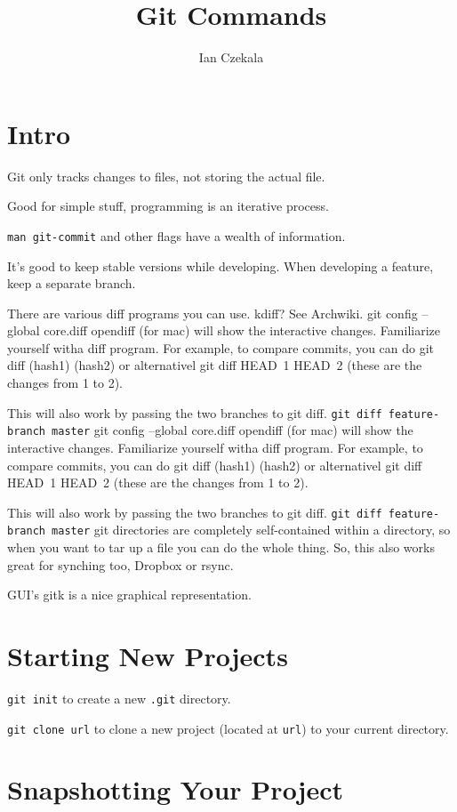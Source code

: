 \documentclass[iop,floatfix]{emulateapj}
\begin{document}
\title{Git Commands}
\author{Ian Czekala}

\section{Intro}
Git only tracks changes to files, not storing the actual file.

Good for simple stuff, programming is an iterative process.

\verb|man git-commit| and other flags have a wealth of information.

It's good to keep stable versions while developing. When developing a feature, keep a separate branch.

There are various diff programs you can use. kdiff? See Archwiki.
git config --global core.diff opendiff (for mac) will show the interactive changes. Familiarize yourself witha diff program. For example, to compare commits, you can do git diff (hash1) (hash2) or alternativel git diff HEAD~1 HEAD~2 (these are the changes from 1 to 2).

This will also work by passing the two branches to git diff. \verb|git diff feature-branch master|
git config --global core.diff opendiff (for mac) will show the interactive changes. Familiarize yourself witha diff program. For example, to compare commits, you can do git diff (hash1) (hash2) or alternativel git diff HEAD~1 HEAD~2 (these are the changes from 1 to 2).

This will also work by passing the two branches to git diff. \verb|git diff feature-branch master|
git directories are completely self-contained within a directory, so when you want to tar up a file you can do the whole thing. So, this also works great for synching too, Dropbox or rsync.

GUI's gitk is a nice graphical representation. 

\section{Starting New Projects}

\verb|git init| to create a new \verb|.git| directory.

\verb|git clone url| to clone a new project (located at \verb|url|) to your
current directory.

\section{Snapshotting Your Project}
\end{document}
